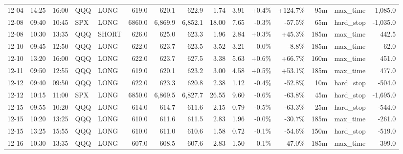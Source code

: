 \documentclass[11pt,a4paper,twoside]{article}
\begin{document}
\begin{landscape}
\begin{center}
\begin{longtable}{>{\color{txtmain}}l l l l l r r r r r r r r >{\color{txtmain}}l r}
12-04 & 14:25 & 16:00 & QQQ & LONG & 619.0 & 620.1 & 622.9 & 1.74 & 3.91 & \textcolor{wingreen}{+0.4\%} & \textcolor{wingreen}{+124.7\%} & 95m & max\_time & \textcolor{wingreen}{1,085.0} \\
12-08 & 09:40 & 10:45 & SPX & LONG & 6860.0 & 6,869.9 & 6,852.1 & 18.00 & 7.65 & \textcolor{lossred}{-0.3\%} & \textcolor{lossred}{-57.5\%} & 65m & hard\_stop & \textcolor{lossred}{-1,035.0} \\
12-08 & 10:30 & 13:35 & QQQ & SHORT & 626.0 & 625.0 & 623.3 & 1.96 & 2.84 & \textcolor{wingreen}{+0.3\%} & \textcolor{wingreen}{+45.3\%} & 185m & max\_time & \textcolor{wingreen}{442.5} \\
12-10 & 09:45 & 12:50 & QQQ & LONG & 622.0 & 623.7 & 623.5 & 3.52 & 3.21 & \textcolor{lossred}{-0.0\%} & \textcolor{lossred}{-8.8\%} & 185m & max\_time & \textcolor{lossred}{-62.0} \\
12-10 & 13:20 & 16:00 & QQQ & LONG & 622.0 & 623.7 & 627.5 & 3.38 & 5.63 & \textcolor{wingreen}{+0.6\%} & \textcolor{wingreen}{+66.7\%} & 160m & max\_time & \textcolor{wingreen}{451.0} \\
12-11 & 09:50 & 12:55 & QQQ & LONG & 619.0 & 620.1 & 623.2 & 3.00 & 4.58 & \textcolor{wingreen}{+0.5\%} & \textcolor{wingreen}{+53.1\%} & 185m & max\_time & \textcolor{wingreen}{477.0} \\
12-12 & 09:40 & 09:50 & QQQ & LONG & 622.0 & 623.3 & 620.8 & 2.38 & 1.12 & \textcolor{lossred}{-0.4\%} & \textcolor{lossred}{-52.8\%} & 10m & hard\_stop & \textcolor{lossred}{-504.0} \\
12-12 & 10:15 & 11:00 & SPX & LONG & 6850.0 & 6,869.5 & 6,827.7 & 26.55 & 9.60 & \textcolor{lossred}{-0.6\%} & \textcolor{lossred}{-63.8\%} & 45m & hard\_stop & \textcolor{lossred}{-1,695.0} \\
12-15 & 09:55 & 10:20 & QQQ & LONG & 614.0 & 614.7 & 611.6 & 2.15 & 0.79 & \textcolor{lossred}{-0.5\%} & \textcolor{lossred}{-63.3\%} & 25m & hard\_stop & \textcolor{lossred}{-544.0} \\
12-15 & 10:20 & 13:25 & QQQ & LONG & 610.0 & 611.6 & 611.5 & 2.83 & 1.96 & \textcolor{lossred}{-0.0\%} & \textcolor{lossred}{-30.7\%} & 185m & max\_time & \textcolor{lossred}{-261.0} \\
12-15 & 13:25 & 15:55 & QQQ & LONG & 610.0 & 611.0 & 610.6 & 1.58 & 0.72 & \textcolor{lossred}{-0.1\%} & \textcolor{lossred}{-54.6\%} & 150m & hard\_stop & \textcolor{lossred}{-519.0} \\
12-16 & 10:30 & 13:35 & QQQ & LONG & 607.0 & 608.5 & 607.6 & 2.83 & 1.50 & \textcolor{lossred}{-0.1\%} & \textcolor{lossred}{-47.0\%} & 185m & max\_time & \textcolor{lossred}{-399.0} \\

\end{longtable}
\end{center}
\end{landscape}
\end{document}
